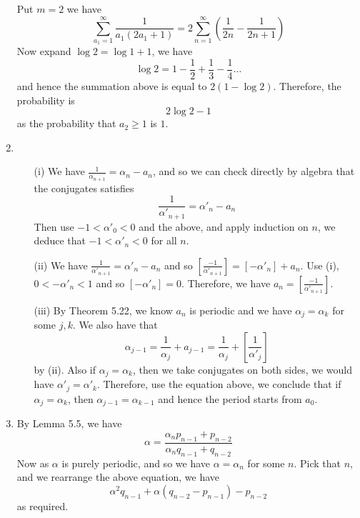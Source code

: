 \begin{enumerate}
      Put $m=2$ we have
      $$\sum_{a_1=1}^{\infty}\frac{1}{a_1(2a_1+1)}=2\sum_{n=1}^{\infty}\left(\frac{1}{2n}-
      \frac{1}{2n+1}\right)$$
      Now expand $\log{2}=\log{1+1}$, we have
      $$\log{2}=1-\frac{1}{2}+\frac{1}{3}-\frac{1}{4} \ldots$$
      and hence the summation above is equal to $2(1-\log{2})$. Therefore, the probability is
      $$2\log{2}-1$$ as the probability that $a_2 \ge 1$ is $1$.\\
\item \begin{enumerate}
      \item[(i)] We have $\frac{1}{\alpha_{n+1}}=\alpha_n-a_n$, and so we can check directly by algebra that
      the conjugates satisfies
      $$\frac{1}{\alpha'_{n+1}}=\alpha'_n-a_n$$
      Then use $-1<\alpha'_0<0$ and the above, and apply induction on $n$, we deduce that
      $-1<\alpha'_n<0$ for all $n$.\\
      \item[(ii)] We have $\frac{1}{\alpha'_{n+1}}=\alpha'_n -a_n$ and so
      $[\frac{-1}{\alpha'_{n+1}}]=[-\alpha'_n]+a_n$. Use (i), $0<-\alpha'_n<1$ and so
      $[-\alpha'_n]=0$. Therefore, we have $a_n=[\frac{-1}{\alpha'_{n+1}}]$.\\
      \item[(iii)] By Theorem 5.22, we know $a_n$ is periodic and we have
      $\alpha_j=\alpha_k$ for some $j,k$. We also have that
      $$\alpha_{j-1}=\frac{1}{\alpha_j}+a_{j-1}=\frac{1}{\alpha_j}+\left[\frac{1}{\alpha'_j}\right]$$
      by (ii). Also if $\alpha_j=\alpha_k$, then we take conjugates on both sides, we would have
      $\alpha'_j=\alpha'_k$. Therefore, use the equation above, we conclude that if
      $\alpha_j=\alpha_k$, then $\alpha_{j-1}=\alpha_{k-1}$ and hence the period starts from $a_0$.
      \end{enumerate}
\item By Lemma 5.5, we have
      $$\alpha=\frac{\alpha_n p_{n-1}+p_{n-2}}{\alpha_n q_{n-1}+q_{n-2}}$$
      Now as $\alpha$ is purely periodic, and so we have $\alpha=\alpha_n$ for some $n$. Pick that $n$,
      and we rearrange the above equation, we have
      $$\alpha^2q_{n-1}+\alpha(q_{n-2}-p_{n-1})-p_{n-2}$$
      as required.


\end{enumerate}
